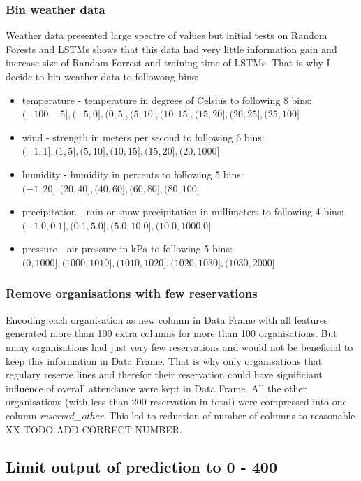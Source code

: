 \documentclass{article}
\begin{document}
\subsubsection{Bin weather data} \label{sec:bin_weather}
Weather data presented large spectre of values but initial tests on Random Forests and LSTMs shows that this data had very little information gain and increase size of Random Forrest and training time of LSTMs. That is why I decide to bin weather data to followong bins:
\begin{itemize}
    \item temperature - temperature in degrees of Celsius to following 8 bins: $(-100, -5], (-5,0], (0,5], (5,10], (10,15], (15,20], (20,25], (25, 100]$
    \item wind - strength in meters per second to following 6 bins: $(-1,1], (1,5], (5,10], (10,15], (15,20], (20, 1000]$
    \item humidity - humidity in percents to following 5 bins: $(-1,20], (20,40], (40,60], (60,80], (80,100]$
    \item precipitation - rain or snow precipitation in millimeters to following 4 bins: $(-1.0,0.1], (0.1,5.0], (5.0,10.0], (10.0,1000.0]$
    \item pressure - air pressure in kPa to following 5 bins: $(0,1000], (1000,1010], (1010,1020], (1020,1030], (1030,2000]$
\end{itemize}

\subsubsection{Remove organisations with few reservations}
Encoding each organisation as new column in Data Frame with all features generated more than 100 extra columns for more than 100 organisations. But many organisations had just very few reservations and would not be beneficial to keep this information in Data Frame. That is why only organisations that regulary reserve lines and therefor their reservation could have significiant influence of overall attendance were kept in Data Frame. All the other organisations (with less than 200 reservation in total) were compressed into one column \emph{reserved\_other}. This led to reduction of number of columns to reasonable XX TODO ADD CORRECT NUMBER.

\subsection{Limit output of prediction to 0 - 400}
\end{document}
